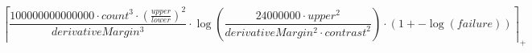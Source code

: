 \[\left\lceil \frac{100000000000000 \cdot count^{3} \cdot \left(\frac{upper}{lower}\right)^{2}}{derivativeMargin^{3}} \cdot \log\left(\frac{24000000 \cdot upper^{2}}{derivativeMargin^{2} \cdot contrast^{2}}\right) \cdot \left(1 + -\log\left(failure\right)\right) \right\rceil_{+}\]

